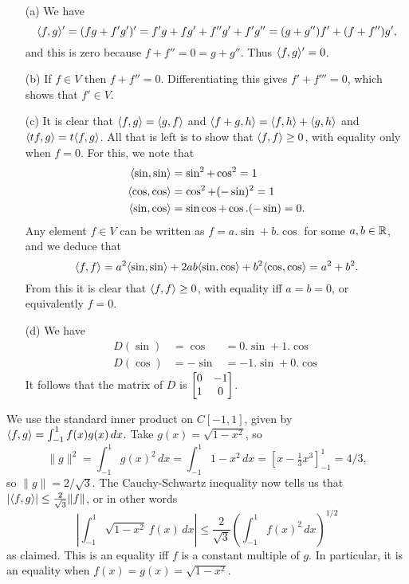  \begin{itemize}
  \item[(a)] We have
   \[ \langle f,g\rangle'=(fg+f'g')'=f'g+fg'+f''g'+f'g''=
       (g+g'')f' + (f+f'')g',
   \]
   and this is zero because $f+f''=0=g+g''$.  Thus $\langle f,g\rangle'=0$.
  \item[(b)] If $f\in V$ then $f+f''=0$.  Differentiating this
  gives $f'+f'''=0$, which shows that $f'\in V$.
  \item[(c)] It is clear that $\langle f,g\rangle=\langle g,f\rangle$ and
   $\langle f+g,h\rangle=\langle f,h\rangle+\langle g,h\rangle$ and $\langle tf,g\rangle=t\langle f,g\rangle$.  All
   that is left is to show that $\langle f,f\rangle\geq 0$, with equality
   only when $f=0$.  For this, we note that
   \begin{align*}
    \langle \sin,\sin\rangle &= \sin^2 + \cos^2 = 1 \\
    \langle \cos,\cos\rangle &= \cos^2 + (-\sin)^2 = 1 \\
    \langle \sin,\cos\rangle &= \sin\cos + \cos.(-\sin) = 0.
   \end{align*}
   Any element $f\in V$ can be written as $f=a.\sin+b.\cos$ for
   some $a,b\in{\mathbb{R}}$, and we deduce that
   \[ \langle f,f\rangle =
       a^2\langle \sin,\sin\rangle + 2ab\langle \sin,\cos\rangle + b^2\langle \cos,\cos\rangle
       = a^2 + b^2.
   \]
   From this it is clear that $\langle f,f\rangle\geq 0$, with equality iff
   $a=b=0$, or equivalently $f=0$.
  \item[(d)]
   We have
   \begin{align*}
    D(\sin) &=  \cos &= 0.\sin + 1.\cos \\
    D(\cos) &= -\sin &= -1.\sin + 0.\cos
   \end{align*}
   It follows that the matrix of $D$ is $\left[\begin{matrix} 0&-1\\1&0\end{matrix}\right]$.
 \end{itemize}
\EndDeferredSolution

 We use the standard inner product on $C[-1,1]$, given by
 $\langle f,g\rangle=\int_{-1}^1f(x)g(x)\,dx$.  Take
 $g(x)=\sqrt{1-x^2}$, so
 \[ \|g\|^2=\int_{-1}^1g(x)^2\,dx=
     \int_{-1}^1 1-x^2\,dx =
     \left[x-\tfrac{1}{3}x^3\right]_{-1}^1 = 4/3,
 \]
 so $\|g\|=2/\sqrt{3}$.  The Cauchy-Schwartz inequality now
 tells us that $|\langle f,g\rangle|\leq\frac{2}{\sqrt{3}}\|f\|$, or
 in other words
 \[ \left|\int_{-1}^1\sqrt{1-x^2}\,f(x)\,dx\right| \leq
     \frac{2}{\sqrt{3}} \left(\int_{-1}^1 f(x)^2\,dx\right)^{1/2}
 \]
 as claimed.  This is an equality iff $f$ is a constant multiple of
 $g$.  In particular, it is an equality when
 $f(x)=g(x)=\sqrt{1-x^2}$.
\EndDeferredSolution

